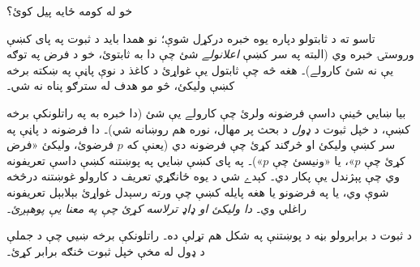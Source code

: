 \documentclass[../../../include/open-logic-section]{subfiles}
\begin{document}


خو له کومه ځايه پيل کوئ؟

تاسو ته د ثابتولو دپاره يوه خبره درکړل شوې؛ نو همدا
بايد د ثبوت په پای کښې وروستۍ خبره وي (البته په سر
کښې \emph{اعلانولے} شئ چې دا به ثابتوئ، خو د فرض
په توګه يې نه شئ کارولے)۔ هغه څه چې ثابتول يې
غواړئ د کاغذ د نوې پاڼې په ښکته برخه کښې وليکئ،
څو مو هدف له سترګو پناه نه شي۔

بيا ښايي ځينې داسې فرضونه ولرئ چې کارولے يې شئ
(دا خبره به په راتلونکې برخه کښې، د خپل ثبوت د
\emph{ډول} د بحث پر مهال، نوره هم روښانه شي)۔ دا
فرضونه د پاڼې په سر کښې وليکئ او څرګند کړئ چې
فرضونه دي (يعنې که $p$ فرضوئ، وليکئ «فرض کړئ
چې $p$»، يا «ونيسئ چې $p$»)۔ په پای کښې ښايي
په پوښتنه کښې داسې تعريفونه وي چې پېژندل يې پکار
دي۔ کېدے شي د يوه ځانګړي تعريف د کارولو غوښتنه
درڅخه شوې وي، يا په فرضونو يا هغه پايله کښې چې
ورته رسېدل غواړئ بېلابېل تعريفونه راغلي وي۔
\emph{دا وليکئ او ډاډ ترلاسه کړئ چې په معنا يې پوهېږئ۔}

د ثبوت د برابرولو بڼه د پوښتنې په شکل هم تړلې ده۔
راتلونکې برخه ښيي چې د جملې د ډول له مخې خپل
ثبوت څنګه برابر کړئ۔
\end{document}

